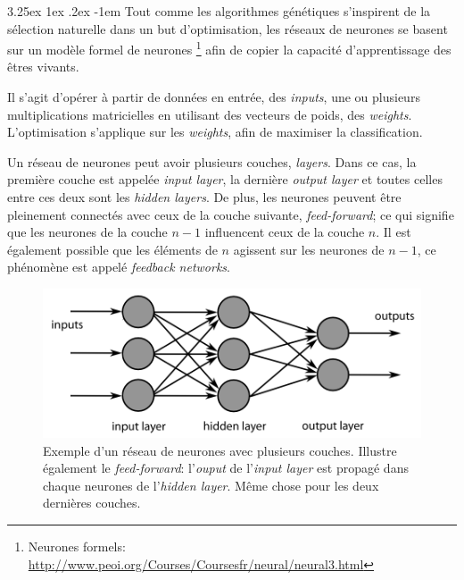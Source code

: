\documentclass[a4paper, 11pt]{article}
\makeatletter
\renewcommand\paragraph{\@startsection{paragraph}{5}{\z@}%
  {3.25ex \@plus1ex \@minus.2ex}%
  {-1em}%
  {\normalfont\normalsize\bfseries}}
\makeatother
\begin{document}
\paragraph{}
Tout comme les algorithmes génétiques s'inspirent de la sélection naturelle dans un but d'optimisation,
les réseaux de neurones se basent sur un modèle formel de neurones
\footnote{Neurones formels: \url{http://www.peoi.org/Courses/Coursesfr/neural/neural3.html}} afin de copier la capacité 
d'apprentissage des êtres vivants.

Il s'agit d'opérer à partir de données en entrée, des \textit{inputs}, une ou plusieurs multiplications matricielles
en utilisant des vecteurs de poids, des \textit{weights}. L'optimisation s'applique sur les \textit{weights},
afin de maximiser la classification.

Un réseau de neurones peut avoir plusieurs couches, \textit{layers}. Dans ce cas, la première couche est
appelée \textit{input layer}, la dernière \textit{output layer} et toutes celles entre ces deux sont
les \textit{hidden layers}. De plus, les neurones peuvent être pleinement connectés avec ceux de la couche
suivante, \textit{feed-forward}; ce qui signifie que les neurones de la couche $n-1$ influencent ceux de
la couche $n$. Il est également possible que les éléments de $n$ agissent sur les neurones de $n-1$, ce
phénomène est appelé \textit{feedback networks}.

\begin{figure}[H]
\centering
\includegraphics[scale=0.4]{images/neural_net_feedforward}
\caption[]{Exemple d'un réseau de neurones avec plusieurs couches. Illustre également
le \textit{feed-forward}: l'\textit{ouput} de l'\textit{input layer} est propagé dans chaque
neurones de l'\textit{hidden layer}. Même chose pour les deux dernières couches.\footnotemark}
\end{figure}
\end{document}

